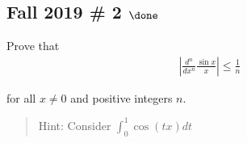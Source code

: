 \hypertarget{fall-2019-2-done}{%
\subsection{\texorpdfstring{Fall 2019 \# 2
\(\done\)}{Fall 2019 \# 2 \textbackslash done}}\label{fall-2019-2-done}}

Prove that
\begin{align*}
\left| \frac{d^{n}}{d x^{n}} \frac{\sin x}{x}\right| \leq \frac{1}{n}
\end{align*}

for all \(x \neq 0\) and positive integers \(n\).

\begin{quote}
Hint: Consider \(\displaystyle\int_0^1 \cos(tx) dt\)
\end{quote}

